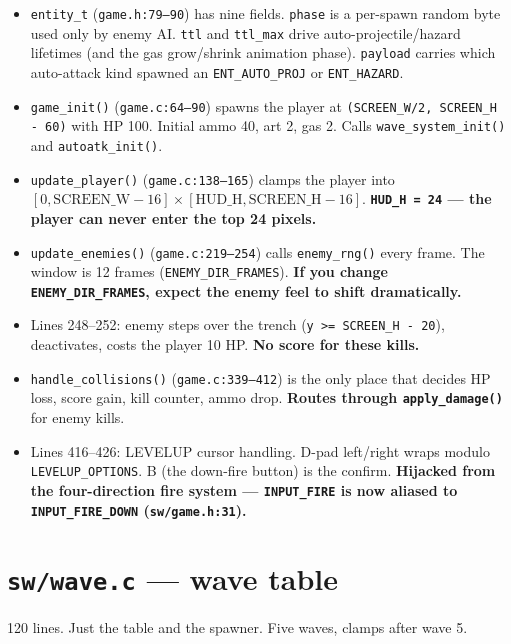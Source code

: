 \documentclass[11pt,letterpaper]{article}
\begin{document}
\begin{itemize}[leftmargin=*]
  \item \texttt{entity\_t} (\texttt{game.h:79--90}) has nine fields.
    \texttt{phase} is a per-spawn random byte used only by enemy AI.
    \texttt{ttl} and \texttt{ttl\_max} drive auto-projectile/hazard
    lifetimes (and the gas grow/shrink animation phase). \texttt{payload}
    carries which auto-attack kind spawned an \texttt{ENT\_AUTO\_PROJ} or
    \texttt{ENT\_HAZARD}.
  \item \texttt{game\_init()} (\texttt{game.c:64--90}) spawns the player at
    \texttt{(SCREEN\_W/2, SCREEN\_H - 60)} with HP 100. Initial ammo 40,
    art 2, gas 2. Calls \texttt{wave\_system\_init()} and
    \texttt{autoatk\_init()}.
  \item \texttt{update\_player()} (\texttt{game.c:138--165}) clamps the
    player into $[0, \text{SCREEN\_W}-16] \times [\text{HUD\_H},
    \text{SCREEN\_H}-16]$. \textbf{\texttt{HUD\_H = 24} --- the player can
    never enter the top 24 pixels.}
  \item \texttt{update\_enemies()} (\texttt{game.c:219--254}) calls
    \texttt{enemy\_rng()} every frame. The window is 12 frames
    (\texttt{ENEMY\_DIR\_FRAMES}). \textbf{If you change
    \texttt{ENEMY\_DIR\_FRAMES}, expect the enemy feel to shift
    dramatically.}
  \item Lines 248--252: enemy steps over the trench
    (\texttt{y >= SCREEN\_H - 20}), deactivates, costs the player 10 HP.
    \textbf{No score for these kills.}
  \item \texttt{handle\_collisions()} (\texttt{game.c:339--412}) is the
    only place that decides HP loss, score gain, kill counter, ammo drop.
    \textbf{Routes through \texttt{apply\_damage()}} for enemy kills.
  \item Lines 416--426: LEVELUP cursor handling. D-pad left/right wraps
    modulo \texttt{LEVELUP\_OPTIONS}. B (the down-fire button) is the
    confirm. \textbf{Hijacked from the four-direction fire system ---
    \texttt{INPUT\_FIRE} is now aliased to \texttt{INPUT\_FIRE\_DOWN}
    (\texttt{sw/game.h:31}).}
\end{itemize}

\section{\texttt{sw/wave.c} --- wave table}

120 lines. Just the table and the spawner. Five waves, clamps after wave 5.
\end{document}
